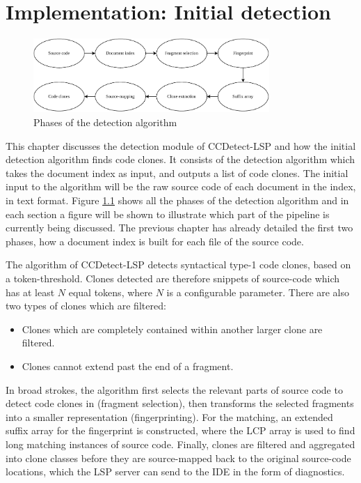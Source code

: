 \chapter{Implementation: Initial detection}
\label{initialdetection}

\begin{figure}[H]
    \begin{center}
        \includegraphics[width=0.8\textwidth]{figures/phases/phases_all.drawio.pdf}
    \end{center}
    \caption{Phases of the detection algorithm}
    \label{fig:allphases}
\end{figure}

This chapter discusses the detection module of CCDetect-LSP and how the initial detection
algorithm finds code clones. It consists of the detection algorithm which takes the
document index as input, and outputs a list of code clones. The initial input to the
algorithm will be the raw source code of each document in the index, in text format.
Figure \ref{fig:allphases} shows all the phases of the detection algorithm and in each
section a figure will be shown to illustrate which part of the pipeline is currently being
discussed. The previous chapter has already detailed the first two phases, how a document
index is built for each file of the source code.

The algorithm of CCDetect-LSP detects syntactical type-1 code clones, based on a
token-threshold. Clones detected are therefore snippets of source-code which has at least
$N$ equal tokens, where $N$ is a configurable parameter. There are also two types of
clones which are filtered:

\begin{itemize}
    \item Clones which are completely contained within another larger clone are filtered.
    \item Clones cannot extend past the end of a fragment.
\end{itemize}


In broad strokes, the algorithm first selects the relevant parts of source code to detect
code clones in (fragment selection), then transforms the selected fragments into a smaller
representation (fingerprinting). For the matching, an extended suffix array for the
fingerprint is constructed, where the LCP array is used to find long matching instances of
source code. Finally, clones are filtered and aggregated into clone classes before they
are source-mapped back to the original source-code locations, which the LSP server can
send to the IDE in the form of diagnostics.

